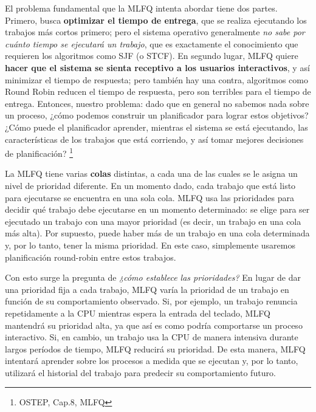 \documentclass{article}
\begin{document}
El problema fundamental que la MLFQ intenta abordar tiene dos partes. Primero, busca \textbf{optimizar el tiempo de entrega}, que se realiza ejecutando los trabajos más cortos primero; pero el sistema operativo generalmente \textit{no sabe por cuánto tiempo se ejecutará un trabajo}, que es exactamente el conocimiento que requieren los algoritmos como SJF (o STCF). En segundo lugar, MLFQ  quiere \textbf{hacer que el sistema se sienta receptivo a los usuarios interactivos}, y así minimizar el tiempo de respuesta; pero también hay una contra, algoritmos como Round Robin reducen el tiempo de respuesta, pero son terribles para el tiempo de entrega. Entonces, nuestro problema: dado que en general no sabemos nada sobre un proceso, ¿cómo podemos construir un planificador para lograr estos objetivos? ¿Cómo puede el planificador aprender, mientras el sistema se está ejecutando, las características de los trabajos que está corriendo, y así tomar mejores decisiones de planificación? \footnote{OSTEP, Cap.8, MLFQ}

La MLFQ tiene varias \textbf{colas} distintas, a cada una de las cuales se le asigna un nivel de prioridad diferente. En un momento dado, cada trabajo que está listo para ejecutarse se encuentra en una sola cola. MLFQ usa las prioridades para decidir qué trabajo debe ejecutarse en un momento determinado: se elige para ser ejecutado un trabajo con una mayor prioridad (es decir, un trabajo en una cola más alta). Por supuesto, puede haber más de un trabajo en una cola determinada y, por lo tanto, tener la misma prioridad. En este caso, simplemente usaremos planificación round-robin entre estos trabajos.

Con esto surge la pregunta de \textit{¿cómo establece las prioridades?} En lugar de dar una prioridad fija a cada trabajo, MLFQ varía la prioridad de un trabajo en función de su comportamiento observado. Si, por ejemplo, un trabajo renuncia repetidamente a la CPU mientras espera la entrada del teclado, MLFQ mantendrá su prioridad alta, ya que así es como podría comportarse un proceso interactivo. Si, en cambio, un trabajo usa la CPU de manera intensiva durante largos períodos de tiempo, MLFQ reducirá su prioridad. De esta manera, MLFQ intentará aprender sobre los procesos a medida que se ejecutan y, por lo tanto, utilizará el historial del trabajo para predecir su comportamiento futuro.
\end{document}
